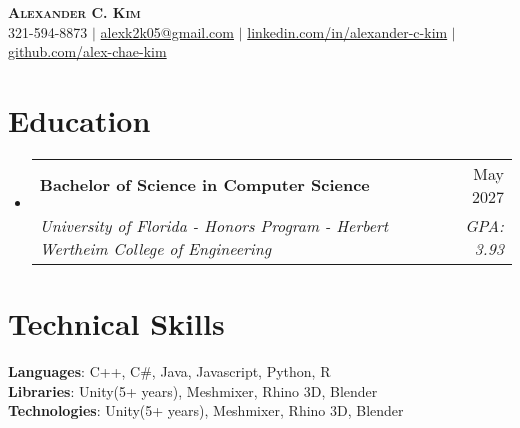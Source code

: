 \documentclass[letterpaper,11pt]{article}
\makeatletter
\newcommand{\resumeSubheading}[4]{
  \vspace{-2pt}\item
    \begin{tabular*}{\textwidth}[t]{l@{\extracolsep{\fill}}r}
      \textbf{#1} & #2 \\
      \textit{\small#3} & \textit{\small #4} \\
    \end{tabular*}\vspace{-7pt}
}
\newcommand{\resumeSubHeadingListStart}{\begin{itemize}[leftmargin=0in, label={}]}
\newcommand{\resumeSubHeadingListEnd}{\end{itemize}}
\makeatother
\begin{document}

\begin{center}
    \textbf{\Huge \scshape Alexander C. Kim} \\ \vspace{1pt}
    \small 321-594-8873 $|$ \href{mailto:x@x.com}{{alexk2k05@gmail.com}} $|$ 
    \href{https://linkedin.com/in/alexander-c-kim}{{linkedin.com/in/alexander-c-kim}} $|$
    \href{https://github.com/alex-chae-kim}{{github.com/alex-chae-kim}}
\end{center}


\section{Education}
  \resumeSubHeadingListStart
    \resumeSubheading
      {Bachelor of Science in Computer Science}{May 2027}
      {University of Florida - Honors Program - Herbert Wertheim College of Engineering}{GPA: 3.93}
  \resumeSubHeadingListEnd

\section{Technical Skills}
 \begin{itemize}[leftmargin=0in, label={}]
    \small{\item{
     \textbf{Languages}{: C++, C\#, Java, Javascript, Python, R} \\
     \textbf{Libraries}{: Unity(5+ years), Meshmixer, Rhino 3D, Blender} \\
     \textbf{Technologies}{: Unity(5+ years), Meshmixer, Rhino 3D, Blender} \\

    }}
 \end{itemize}
\end{document}
